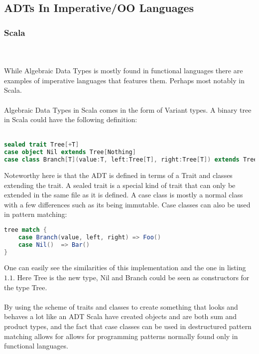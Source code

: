 \documentclass[10pt]{report}
\begin{document}
\subsection{ADTs In Imperative/OO Languages}
\subsubsection{Scala}
\par{\noindent \\\\While Algebraic Data Types is mostly found in functional languages there are examples of imperative languages that features them. Perhaps most notably in Scala.}
\\
\\
Algebraic Data Types in Scala comes in the form of Variant types. A binary tree in Scala could have the following definition:
\\
\\

\begin{lstlisting}[language=Scala,caption={ADT definition in Scala},label={lst:e4c_syntax}]
sealed trait Tree[+T]
case object Nil extends Tree[Nothing]
case class Branch[T](value:T, left:Tree[T], right:Tree[T]) extends Tree[T]
\end{lstlisting}
Noteworthy here is that the ADT is defined in terms of a Trait and classes extending the trait.  A sealed trait is a special kind of trait that can only be extended in the same file as it is defined.  A case class is mostly a normal class with a few differences such as its being immutable.  Case classes can also be used in pattern matching:
\begin{lstlisting}[language=Scala,caption={Pattern matching on an ADT in Scala}]
tree match {
    case Branch(value, left, right) => Foo()
    case Nil()  => Bar()
}
\end{lstlisting}
One can easily see the similarities of this implementation and the one in listing $1.1$. Here Tree is the new type, Nil and Branch could be seen as constructors for the type Tree.
\\
\\
By using the scheme of traits and classes to create something that looks and behaves a lot like an ADT Scala have created objects and are both sum and product types, and the fact that case classes can be used in destructured pattern matching allows for allows for programming patterns normally found only in functional languages.
\end{document}
